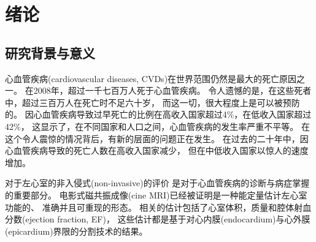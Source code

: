 
\chapter{绪论}


\section{研究背景与意义}

心血管疾病(cardiovascular diseases, CVDs)在世界范围仍然是最大的死亡原因之一。
在2008年，超过一千七百万人死于心血管疾病。
令人遗憾的是，在这些死者中，超过三百万人在死亡时不足六十岁，
而这一切，很大程度上是可以被预防的。
因心血管疾病导致过早死亡的比例在高收入国家超过4\%，在低收入国家超过42\%，
这显示了，在不同国家和人口之间，心血管疾病的发生率严重不平等。
在这个令人震惊的情况背后，有新的层面的问题正在发生。
在过去的二十年中，因心血管疾病导致的死亡人数在高收入国家减少，
但在中低收入国家以惊人的速度增加。

对于左心室的非入侵式(non-invasive)的评价
是对于心血管疾病的诊断与病症掌握的重要部分。
电影式磁共振成像(cine MRI)已经被证明是一种能定量估计左心室功能的、
准确并且可重现的形态。
相关的估计包括了心室体积，质量和腔体射血分数(ejection fraction, EF)，
这些估计都是基于对心内膜(endocardium)与心外膜(epicardium)界限的分割技术的结果。



